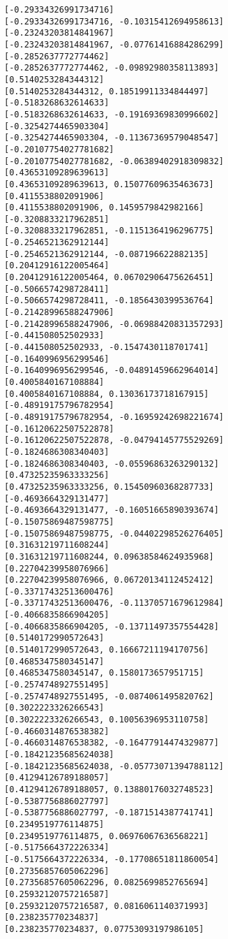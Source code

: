 \documentclass[11pt]{article}
\begin{document}
\begin{Verbatim}[commandchars=\\\{\}]
[-0.29334326991734716]
[-0.29334326991734716, -0.10315412694958613]
[-0.23243203814841967]
[-0.23243203814841967, -0.07761416884286299]
[-0.2852637772774462]
[-0.2852637772774462, -0.09892980358113893]
[0.5140253284344312]
[0.5140253284344312, 0.18519911334844497]
[-0.5183268632614633]
[-0.5183268632614633, -0.19169369830996602]
[-0.3254274465903304]
[-0.3254274465903304, -0.11367369579048547]
[-0.20107754027781682]
[-0.20107754027781682, -0.06389402918309832]
[0.43653109289639613]
[0.43653109289639613, 0.15077609635463673]
[0.4115538802091906]
[0.4115538802091906, 0.1459579842982166]
[-0.3208833217962851]
[-0.3208833217962851, -0.1151364196296775]
[-0.2546521362912144]
[-0.2546521362912144, -0.087196622882135]
[0.20412916122005464]
[0.20412916122005464, 0.06702906475626451]
[-0.5066574298728411]
[-0.5066574298728411, -0.1856430399536764]
[-0.21428996588247906]
[-0.21428996588247906, -0.06988420831357293]
[-0.441508052502933]
[-0.441508052502933, -0.1547430118701741]
[-0.1640996956299546]
[-0.1640996956299546, -0.04891459662964014]
[0.4005840167108884]
[0.4005840167108884, 0.13036173718167915]
[-0.48919175796782954]
[-0.48919175796782954, -0.16959242698221674]
[-0.16120622507522878]
[-0.16120622507522878, -0.04794145775529269]
[-0.1824686308340403]
[-0.1824686308340403, -0.05596863263290132]
[0.47325235963333256]
[0.47325235963333256, 0.15450960368287733]
[-0.4693664329131477]
[-0.4693664329131477, -0.16051665890393674]
[-0.15075869487598775]
[-0.15075869487598775, -0.04402298526276405]
[0.31631219711608244]
[0.31631219711608244, 0.09638584624935968]
[0.22704239958076966]
[0.22704239958076966, 0.06720134112452412]
[-0.33717432513600476]
[-0.33717432513600476, -0.11370571679612984]
[-0.4066835866904205]
[-0.4066835866904205, -0.13711497357554428]
[0.5140172990572643]
[0.5140172990572643, 0.16667211194170756]
[0.4685347580345147]
[0.4685347580345147, 0.1580173657951715]
[-0.2574748927551495]
[-0.2574748927551495, -0.0874061495820762]
[0.3022223326266543]
[0.3022223326266543, 0.10056396953110758]
[-0.4660314876538382]
[-0.4660314876538382, -0.16477914474329877]
[-0.18421235685624038]
[-0.18421235685624038, -0.05773071394788112]
[0.41294126789188057]
[0.41294126789188057, 0.13880176032748523]
[-0.5387756886027797]
[-0.5387756886027797, -0.1871514387741741]
[0.2349519776114875]
[0.2349519776114875, 0.06976067636568221]
[-0.5175664372226334]
[-0.5175664372226334, -0.17708651811860054]
[0.27356857605062296]
[0.27356857605062296, 0.0825699852765694]
[0.25932120757216587]
[0.25932120757216587, 0.0816061140371993]
[0.238235770234837]
[0.238235770234837, 0.07753093197986105]

\end{Verbatim}
\end{document}
